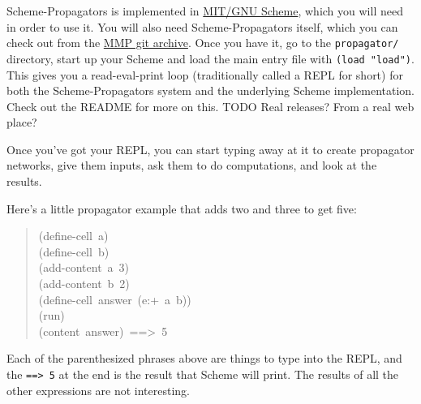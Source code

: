 \documentclass[12pt,letterpaper,english]{article}
\begin{document}
Scheme-Propagators is implemented in \href{http://www.gnu.org/software/mit-scheme/}{MIT/GNU Scheme}, which you will
need in order to use it.  You will also need Scheme-Propagators
itself, which you can check out from the \href{git@github.com:MIT-MMP/propagator.git}{MMP git archive}.  Once you
have it, go to the \texttt{propagator/} directory, start up your Scheme and
load the main entry file with \texttt{(load "load")}.  This gives you a
read-eval-print loop (traditionally called a REPL for short) for both
the Scheme-Propagators system and the underlying Scheme
implementation.  Check out the README for more on this.
TODO Real releases?  From a real web place?

Once you've got your REPL, you can start typing away at it to create
propagator networks, give them inputs, ask them to do computations,
and look at the results.

Here's a little propagator example that adds two and three to get
five:
\begin{quote}{\ttfamily \raggedright \noindent
(define-cell~a)~\\
(define-cell~b)~\\
(add-content~a~3)~\\
(add-content~b~2)~\\
(define-cell~answer~(e:+~a~b))~\\
(run)~\\
(content~answer)~==>~5
}\end{quote}

Each of the parenthesized phrases above are things to type into the
REPL, and the \texttt{==> 5} at the end is the result that Scheme will
print.  The results of all the other expressions are not interesting.
\end{document}
